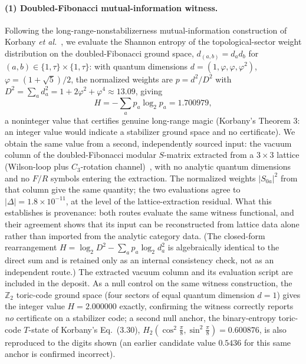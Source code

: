\documentclass[aps,pra,twocolumn,superscriptaddress,longbibliography,floatfix,nofootinbib]{revtex4-2}
\begin{document}
\paragraph{(1) Doubled-Fibonacci mutual-information witness.} Following
the long-range-nonstabilizerness mutual-information construction of
Korbany \emph{et al.}~\cite{Korbany2026}, we evaluate the Shannon
entropy of the topological-sector weight distribution on the
doubled-Fibonacci ground space, $d_{(a,b)}=d_a d_b$ for
$(a,b)\in\{1,\tau\}\times\{1,\tau\}$: with quantum dimensions
$d=(1,\varphi,\varphi,\varphi^2)$, $\varphi=(1+\sqrt5)/2$, the
normalized weights are $p=d^2/D^2$ with
$D^2=\sum_a d_a^2=1+2\varphi^2+\varphi^4\approx13.09$, giving
\begin{equation}
H = -\sum_a p_a\log_2 p_a = 1.700979,
\end{equation}
a noninteger value that certifies genuine long-range magic (Korbany's
Theorem 3: an integer value would indicate a stabilizer ground space
and no certificate). We obtain the same value from a second,
independently sourced input: the vacuum column of the doubled-Fibonacci
modular $S$-matrix extracted from a $3\times3$ lattice (Wilson-loop
plus $C_3$-rotation channel)~\cite{Sayim2026realspace}, with no analytic quantum dimensions and
no $F/R$ symbols entering the extraction. The normalized weights
$\lvert S_{0a}\rvert^2$ from that column give the same quantity; the
two evaluations agree to $\lvert\Delta\rvert=1.8\times10^{-11}$, at the
level of the lattice-extraction residual. What this establishes is
provenance: both
routes evaluate the same witness functional, and their agreement shows
that its input can be reconstructed from lattice data alone rather than
imported from the analytic category data. (The closed-form rearrangement
$H=\log_2 D^2-\sum_a p_a\log_2 d_a^2$ is algebraically identical to the
direct sum and is retained only as an internal consistency check, not
as an independent route.) The extracted vacuum column and its
evaluation script are included in the deposit. As a null control on the same
witness construction, the $\mathbb{Z}_2$ toric-code ground space
(four sectors of equal quantum dimension $d=1$) gives the integer
value $H=2.000000$ exactly, confirming the witness correctly reports
\emph{no} certificate on a stabilizer code; a second null anchor, the
binary-entropy toric-code $T$-state of Korbany's Eq.~(3.30),
$H_2(\cos^2\tfrac\pi8,\sin^2\tfrac\pi8)=0.600876$, is also reproduced
to the digits shown (an earlier candidate value $0.5436$ for this same
anchor is confirmed incorrect).
\end{document}
